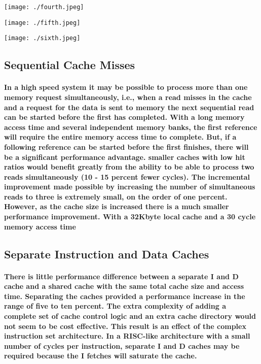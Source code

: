 \documentclass{article}
\begin{document}
\texttt{[image: ./fourth.jpeg]}

\texttt{[image: ./fifth.jpeg]}

\texttt{[image: ./sixth.jpeg]}

\subsection{Sequential Cache Misses}

\paragraph{ In a high speed system it may be possible to process more 
than one memory request simultaneously, i.e., when a read misses in the
 cache and a request for the data is sent to memory the next sequential 
 read can be started before the first has completed. With a long memory 
 access time and several independent memory banks, the first reference will 
 require the entire memory access time to complete. But, if a following reference 
 can be started before the first finishes, there will be a significant performance 
 advantage.  smaller caches with low hit ratios would benefit greatly from the
  ability to be able to process two reads simultaneously (10 - 15 percent fewer cycles). 
  The incremental improvement made possible by increasing the number of simultaneous 
  reads to three is extremely small, on the order of one percent. However, as the cache size
   is increased there is a much smaller performance improvement. With a 32Kbyte local cache 
   and a 30 cycle memory access time }

\subsection{Separate Instruction and Data Caches}

\paragraph{There is  little performance difference between a separate I
 and D cache and a shared cache with the same total cache size and access 
 time. Separating the caches provided a performance increase in the range of 
 five to ten percent. The extra complexity of adding a complete set of cache 
 control logic and an extra cache directory would not seem to be cost effective.
  This result is an effect of the complex instruction set architecture. In
   a RISC-like architecture with a small number of cycles per instruction, 
   separate I and D caches may be required because the I fetches will saturate the cache.}
\end{document}
